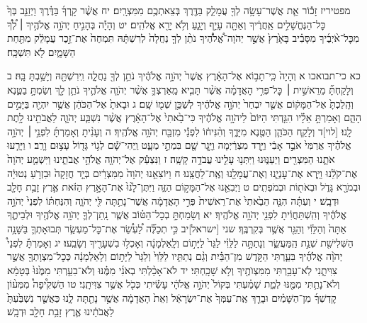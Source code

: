 \documentclass[twoside, openany, parskip=half, 11pt]{book}
\begin{document}
מפטיריז זָכ֕וֹר אֵ֛ת אֲשֶׁר־עָשָׂ֥ה לְךָ֖ עֲמָלֵ֑ק בַּדֶּ֖רֶךְ בְּצֵאתְכֶ֥ם מִמִּצְרָֽיִם׃ יח אֲשֶׁ֨ר קָֽרְךָ֜ בַּדֶּ֗רֶךְ וַיְזַנֵּ֤ב בְּךָ֙ כׇּל־הַנֶּחֱשָׁלִ֣ים אַֽחֲרֶ֔יךָ וְאַתָּ֖ה עָיֵ֣ף וְיָגֵ֑עַ וְלֹ֥א יָרֵ֖א אֱלֹהִֽים׃ יט וְהָיָ֡ה בְּהָנִ֣יחַ יְהֹוָ֣ה אֱלֹהֶ֣יךָ ׀ לְ֠ךָ֠ מִכׇּל־אֹ֨יְבֶ֜יךָ מִסָּבִ֗יב בָּאָ֙רֶץ֙ אֲשֶׁ֣ר יְהֹוָה־אֱ֠לֹהֶ֠יךָ נֹתֵ֨ן לְךָ֤ נַחֲלָה֙ לְרִשְׁתָּ֔הּ תִּמְחֶה֙ אֶת־זֵ֣כֶר עֲמָלֵ֔ק מִתַּ֖חַת הַשָּׁמָ֑יִם לֹ֖א תִּשְׁכָּֽח׃

כא כי־תבואכו א וְהָיָה֙ כִּֽי־תָב֣וֹא אֶל־הָאָ֔רֶץ אֲשֶׁר֙ יְהֹוָ֣ה אֱלֹהֶ֔יךָ נֹתֵ֥ן לְךָ֖ נַחֲלָ֑ה וִֽירִשְׁתָּ֖הּ וְיָשַׁ֥בְתָּ בָּֽהּ׃ ב וְלָקַחְתָּ֞ מֵרֵאשִׁ֣ית ׀ כׇּל־פְּרִ֣י הָאֲדָמָ֗ה אֲשֶׁ֨ר תָּבִ֧יא מֵֽאַרְצְךָ֛ אֲשֶׁ֨ר יְהֹוָ֧ה אֱלֹהֶ֛יךָ נֹתֵ֥ן לָ֖ךְ וְשַׂמְתָּ֣ בַטֶּ֑נֶא וְהָֽלַכְתָּ֙ אֶל־הַמָּק֔וֹם אֲשֶׁ֤ר יִבְחַר֙ יְהֹוָ֣ה אֱלֹהֶ֔יךָ לְשַׁכֵּ֥ן שְׁמ֖וֹ שָֽׁם׃ ג וּבָאתָ֙ אֶל־הַכֹּהֵ֔ן אֲשֶׁ֥ר יִהְיֶ֖ה בַּיָּמִ֣ים הָהֵ֑ם וְאָמַרְתָּ֣ אֵלָ֗יו הִגַּ֤דְתִּי הַיּוֹם֙ לַיהֹוָ֣ה אֱלֹהֶ֔יךָ כִּי־בָ֙אתִי֙ אֶל־הָאָ֔רֶץ אֲשֶׁ֨ר נִשְׁבַּ֧ע יְהֹוָ֛ה לַאֲבֹתֵ֖ינוּ לָ֥תֶת לָֽנוּ׃ [לוי]ד וְלָקַ֧ח הַכֹּהֵ֛ן הַטֶּ֖נֶא מִיָּדֶ֑ךָ וְהִ֨נִּיח֔וֹ לִפְנֵ֕י מִזְבַּ֖ח יְהֹוָ֥ה אֱלֹהֶֽיךָ׃ ה וְעָנִ֨יתָ וְאָמַרְתָּ֜ לִפְנֵ֣י ׀ יְהֹוָ֣ה אֱלֹהֶ֗יךָ אֲרַמִּי֙ אֹבֵ֣ד אָבִ֔י וַיֵּ֣רֶד מִצְרַ֔יְמָה וַיָּ֥גׇר שָׁ֖ם בִּמְתֵ֣י מְעָ֑ט וַֽיְהִי־שָׁ֕ם לְג֥וֹי גָּד֖וֹל עָצ֥וּם וָרָֽב׃ ו וַיָּרֵ֧עוּ אֹתָ֛נוּ הַמִּצְרִ֖ים וַיְעַנּ֑וּנוּ וַיִּתְּנ֥וּ עָלֵ֖ינוּ עֲבֹדָ֥ה קָשָֽׁה׃ ז וַנִּצְעַ֕ק אֶל־יְהֹוָ֖ה אֱלֹהֵ֣י אֲבֹתֵ֑ינוּ וַיִּשְׁמַ֤ע יְהֹוָה֙ אֶת־קֹלֵ֔נוּ וַיַּ֧רְא אֶת־עׇנְיֵ֛נוּ וְאֶת־עֲמָלֵ֖נוּ וְאֶֽת־לַחֲצֵֽנוּ׃ ח וַיּוֹצִאֵ֤נוּ יְהֹוָה֙ מִמִּצְרַ֔יִם בְּיָ֤ד חֲזָקָה֙ וּבִזְרֹ֣עַ נְטוּיָ֔ה וּבְמֹרָ֖א גָּדֹ֑ל וּבְאֹת֖וֹת וּבְמֹפְתִֽים׃ ט וַיְבִאֵ֖נוּ אֶל־הַמָּק֣וֹם הַזֶּ֑ה וַיִּתֶּן־לָ֙נוּ֙ אֶת־הָאָ֣רֶץ הַזֹּ֔את אֶ֛רֶץ זָבַ֥ת חָלָ֖ב וּדְבָֽשׁ׃ י וְעַתָּ֗ה הִנֵּ֤ה הֵבֵ֙אתִי֙ אֶת־רֵאשִׁית֙ פְּרִ֣י הָאֲדָמָ֔ה אֲשֶׁר־נָתַ֥תָּה לִּ֖י יְהֹוָ֑ה וְהִנַּחְתּ֗וֹ לִפְנֵי֙ יְהֹוָ֣ה אֱלֹהֶ֔יךָ וְהִֽשְׁתַּחֲוִ֔יתָ לִפְנֵ֖י יְהֹוָ֥ה אֱלֹהֶֽיךָ׃ יא וְשָׂמַחְתָּ֣ בְכׇל־הַטּ֗וֹב אֲשֶׁ֧ר נָֽתַן־לְךָ֛ יְהֹוָ֥ה אֱלֹהֶ֖יךָ וּלְבֵיתֶ֑ךָ אַתָּה֙ וְהַלֵּוִ֔י וְהַגֵּ֖ר אֲשֶׁ֥ר בְּקִרְבֶּֽךָ׃
שני [ישראל]יב כִּ֣י תְכַלֶּ֞ה לַ֠עְשֵׂ֠ר אֶת־כׇּל־מַעְשַׂ֧ר תְּבוּאָתְךָ֛ בַּשָּׁנָ֥ה הַשְּׁלִישִׁ֖ת שְׁנַ֣ת הַֽמַּעֲשֵׂ֑ר וְנָתַתָּ֣ה לַלֵּוִ֗י לַגֵּר֙ לַיָּת֣וֹם וְלָֽאַלְמָנָ֔ה וְאָכְל֥וּ בִשְׁעָרֶ֖יךָ וְשָׂבֵֽעוּ׃ יג וְאָמַרְתָּ֡ לִפְנֵי֩ יְהֹוָ֨ה אֱלֹהֶ֜יךָ בִּעַ֧רְתִּי הַקֹּ֣דֶשׁ מִן־הַבַּ֗יִת וְגַ֨ם נְתַתִּ֤יו לַלֵּוִי֙ וְלַגֵּר֙ לַיָּת֣וֹם וְלָאַלְמָנָ֔ה כְּכׇל־מִצְוָתְךָ֖ אֲשֶׁ֣ר צִוִּיתָ֑נִי לֹֽא־עָבַ֥רְתִּי מִמִּצְוֺתֶ֖יךָ וְלֹ֥א שָׁכָֽחְתִּי׃ יד לֹא־אָכַ֨לְתִּי בְאֹנִ֜י מִמֶּ֗נּוּ וְלֹא־בִעַ֤רְתִּי מִמֶּ֙נּוּ֙ בְּטָמֵ֔א וְלֹא־נָתַ֥תִּי מִמֶּ֖נּוּ לְמֵ֑ת שָׁמַ֗עְתִּי בְּקוֹל֙ יְהֹוָ֣ה אֱלֹהָ֔י עָשִׂ֕יתִי כְּכֹ֖ל אֲשֶׁ֥ר צִוִּיתָֽנִי׃ טו הַשְׁקִ֩יפָה֩ מִמְּע֨וֹן קׇדְשְׁךָ֜ מִן־הַשָּׁמַ֗יִם וּבָרֵ֤ךְ אֶֽת־עַמְּךָ֙ אֶת־יִשְׂרָאֵ֔ל וְאֵת֙ הָאֲדָמָ֔ה אֲשֶׁ֥ר נָתַ֖תָּה לָ֑נוּ כַּאֲשֶׁ֤ר נִשְׁבַּ֙עְתָּ֙ לַאֲבֹתֵ֔ינוּ אֶ֛רֶץ זָבַ֥ת חָלָ֖ב וּדְבָֽשׁ׃
\end{document}
